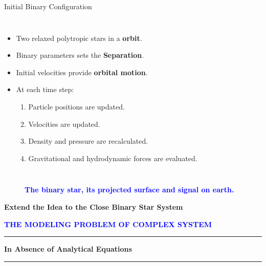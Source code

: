 \documentclass{beamer}
\begin{document}
    \begin{frame}{Initial Binary Configuration}
    	\begin{columns}[c]
    		\begin{itemize}
    			\item Two relaxed polytropic stars in a \textbf{orbit}.
    			\item Binary parameters sets the \textbf{Separation}.
    			\item Initial velocities provide \textbf{orbital motion}.
    			\item At each time step:
    			\begin{enumerate}
    				\item Particle positions are updated.
    				\item Velocities are updated.
    				\item Density and pressure are recalculated.
    				\item Gravitational and hydrodynamic forces are evaluated.
    			\end{enumerate}
    		\end{itemize}
    		
    		\begin{figure}
    		\end{figure}
    	\end{columns}    	
    \end{frame}

    \begin{frame}
    	\centering
    	\begin{figure}
    		\caption*{\textbf{\textcolor{blue}{The binary star, its projected surface and signal on earth.}}}
    	\end{figure}
    \end{frame}

    \begin{frame}
    	\centering
    	\vfill	
    	{\Large\textbf{Extend the Idea to the Close Binary Star System}}
    	
    	\textbf{\textcolor{blue}{THE MODELING PROBLEM OF COMPLEX SYSTEM}}	
    	
    	\vspace{0.5cm}	
    	{\color{blue}\rule{0.25\textwidth}{1.5pt}}    
    	\hspace{0.15cm}
    	{\color{red}\textbf{\Large In Absence of Analytical Equations}}
    	
    	\hspace{0.15cm}
    	{\color{blue}\rule{0.25\textwidth}{1.5pt}}	
    	\vfill
    \end{frame}
\end{document}

